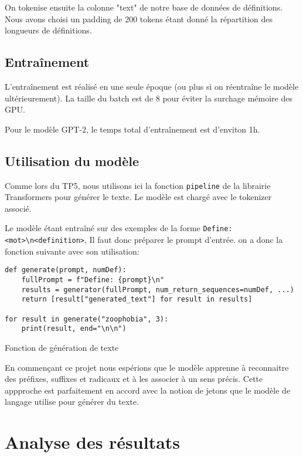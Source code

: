 \documentclass[french]{template}
\begin{document}
On tokenise ensuite la colonne "text" de notre base de données de définitions. Nous avons choisi un padding de 200 tokens étant donné la répartition des longueurs de définitions.

\subsection{Entraînement}

L'entraînement est réalisé en une seule époque (ou plus si on réentraîne le modèle ultérieurement). La taille du batch est de 8 pour éviter la surchage mémoire des GPU.

Pour le modèle GPT-2, le temps total d'entraînement est d'enviton 1h.

\subsection{Utilisation du modèle}

Comme lors du TP5, nous utilisons ici la fonction \texttt{pipeline} de la librairie Transformers pour générer le texte. Le modèle est chargé avec le tokenizer associé.

Le modèle étant entraîné sur des exemples de la forme \texttt{Define: \textless mot\textgreater\textbackslash n\textless definition\textgreater}, Il faut donc préparer le prompt d'entrée.
on a donc la fonction suivante avec son utilisation:
\begin{listing}[H]
    \begin{verbatim}
def generate(prompt, numDef):
    fullPrompt = f"Define: {prompt}\n"
    results = generator(fullPrompt, num_return_sequences=numDef, ...)
    return [result["generated_text"] for result in results]

for result in generate("zoophobia", 3):
    print(result, end="\n\n")
    \end{verbatim}
    \caption{Fonction de génération de texte}
\end{listing}

En commençant ce projet nous espérions que le modèle apprenne à reconnaitre des préfixes, suffixes et radicaux et à les associer à un sens précis. Cette appproche est parfaitement en accord avec la notion de jetons que le modèle de langage utilise pour générer du texte.


\section{Analyse des résultats}

\end{document}
